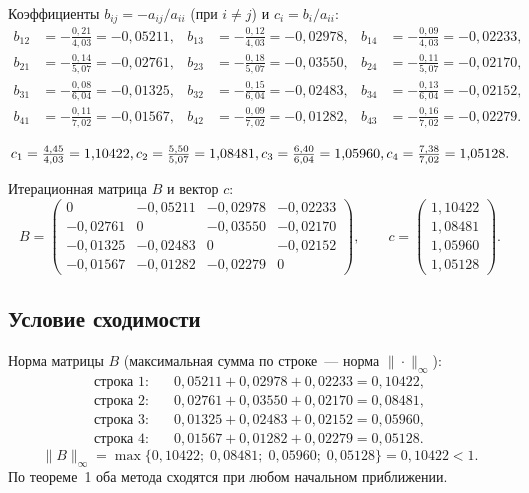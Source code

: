 \documentclass[a4paper, final]{article}
\begin{document}
Коэффициенты $b_{ij} = -a_{ij}/a_{ii}$ (при $i \ne j$) и $c_i = b_i/a_{ii}$:
\begin{align*}
b_{12} &= -\tfrac{0{,}21}{4{,}03} = -0{,}05211, &
b_{13} &= -\tfrac{0{,}12}{4{,}03} = -0{,}02978, &
b_{14} &= -\tfrac{0{,}09}{4{,}03} = -0{,}02233, \\[4pt]
b_{21} &= -\tfrac{0{,}14}{5{,}07} = -0{,}02761, &
b_{23} &= -\tfrac{0{,}18}{5{,}07} = -0{,}03550, &
b_{24} &= -\tfrac{0{,}11}{5{,}07} = -0{,}02170, \\[4pt]
b_{31} &= -\tfrac{0{,}08}{6{,}04} = -0{,}01325, &
b_{32} &= -\tfrac{0{,}15}{6{,}04} = -0{,}02483, &
b_{34} &= -\tfrac{0{,}13}{6{,}04} = -0{,}02152, \\[4pt]
b_{41} &= -\tfrac{0{,}11}{7{,}02} = -0{,}01567, &
b_{42} &= -\tfrac{0{,}09}{7{,}02} = -0{,}01282, &
b_{43} &= -\tfrac{0{,}16}{7{,}02} = -0{,}02279.
\end{align*}

\[
c_1 = \tfrac{4{,}45}{4{,}03}  =  1{,}10422,\\[4pt]
c_2 = \tfrac{5{,}50}{5{,}07}  =  1{,}08481,\\[4pt]
c_3 = \tfrac{6{,}40}{6{,}04}  =  1{,}05960,\\[4pt]
c_4 = \tfrac{7{,}38}{7{,}02}  =  1{,}05128.
\]

Итерационная матрица $B$ и вектор $c$:
\[
B = \begin{pmatrix}
0          & -0{,}05211 & -0{,}02978 & -0{,}02233 \\
-0{,}02761 & 0          & -0{,}03550 & -0{,}02170 \\
-0{,}01325 & -0{,}02483 & 0          & -0{,}02152 \\
-0{,}01567 & -0{,}01282 & -0{,}02279 & 0
\end{pmatrix},\qquad
c = \begin{pmatrix}1{,}10422\\1{,}08481\\1{,}05960\\1{,}05128\end{pmatrix}.
\]

\subsection{Условие сходимости}

Норма матрицы $B$ (максимальная сумма по строке~--- норма $\|\cdot\|_\infty$):
\begin{align*}
\text{строка 1:}&\quad 0{,}05211+0{,}02978+0{,}02233 = 0{,}10422,\\
\text{строка 2:}&\quad 0{,}02761+0{,}03550+0{,}02170 = 0{,}08481,\\
\text{строка 3:}&\quad 0{,}01325+0{,}02483+0{,}02152 = 0{,}05960,\\
\text{строка 4:}&\quad 0{,}01567+0{,}01282+0{,}02279 = 0{,}05128.
\end{align*}
\[
\|B\|_\infty = \max\{0{,}10422;\;0{,}08481;\;0{,}05960;\;0{,}05128\} = 0{,}10422 < 1.
\]
По теореме~1 оба метода сходятся при любом начальном приближении.
\end{document}
